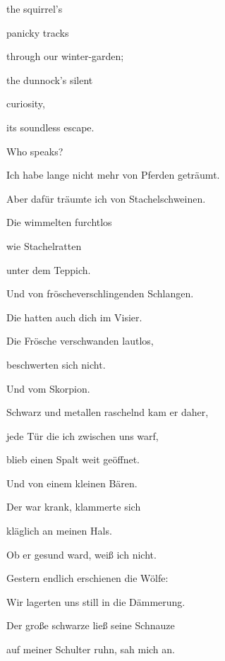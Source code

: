 \documentclass[a4paper]{article}
\begin{document}
\bigskip

the squirrel’s 

panicky tracks

through our winter-garden;


\bigskip

the dunnock’s silent

curiosity,

its soundless escape.


\bigskip

Who speaks?


\bigskip



\bigskip

Ich habe lange nicht mehr von Pferden geträumt.


\bigskip

Aber dafür träumte ich von Stachelschweinen.

Die wimmelten furchtlos

wie Stachelratten 

unter dem Teppich.


\bigskip

Und von fröscheverschlingenden Schlangen.

Die hatten auch dich im Visier.

Die Frösche verschwanden lautlos,

beschwerten sich nicht.


\bigskip

Und vom Skorpion.

Schwarz und metallen raschelnd kam er daher,

jede Tür die ich zwischen uns warf,

blieb einen Spalt weit geöffnet.


\bigskip

Und von einem kleinen Bären.

Der war krank, klammerte sich 

kläglich an meinen Hals.

Ob er gesund ward, weiß ich nicht.


\bigskip

Gestern endlich erschienen die Wölfe:


\bigskip

Wir lagerten uns still in die Dämmerung.

Der große schwarze ließ seine Schnauze

auf meiner Schulter ruhn, sah mich an.
\end{document}
